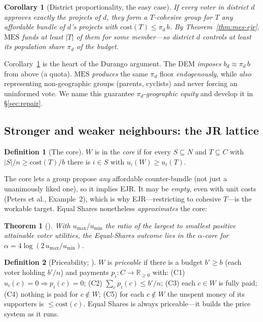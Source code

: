 \documentclass[11pt,letterpaper]{article}
\theoremstyle{definition}
\newtheorem{definition}{Definition}[section]
\theoremstyle{plain}
\newtheorem{theorem}{Theorem}[section]
\newtheorem{corollary}{Corollary}[section]
\theoremstyle{remark}
\newcommand{\R}{\mathbb{R}}
\newcommand{\voters}{N}            %
\newcommand{\projects}{C}          %
\newcommand{\budget}{b}            %
\newcommand{\cost}{\mathrm{cost}}  %
\newcommand{\popshare}{\pi}        %
\newcommand{\MES}{\mathrm{MES}}
\begin{document}
\begin{corollary}[District proportionality, the easy case]
\label{cor:district}
If every voter in district $d$ approves exactly the projects of $d$, they form a $T$-cohesive group
for $T$ any affordable bundle of $d$'s projects with $\cost(T)\le \popshare_d\,\budget$. By
Theorem~\ref{thm:mes-ejr}, $\MES$ funds at least $|T|$ of them for some member---so district $d$
controls at least its population share $\popshare_d$ of the budget.
\end{corollary}

\begin{connection}
Corollary~\ref{cor:district} is the heart of the Durango argument. The DEM \emph{imposes}
$\budget_d\approx\popshare_d\,\budget$ from above (a quota). $\MES$ \emph{produces} the same
$\popshare_d$ floor \emph{endogenously}, while \emph{also} representing non-geographic groups
(parents, cyclists) and never forcing an uninformed vote. We name this guarantee
$\popshare_d$-\emph{geographic equity} and develop it in \S\ref{sec:repair}.
\end{connection}

\subsection{Stronger and weaker neighbours: the JR lattice}

\begin{definition}[The core]
$W$ is in the \emph{core} if for every $S\subseteq \voters$ and $T\subseteq \projects$ with
$|S|/n\ge\cost(T)/\budget$ there is $i\in S$ with $u_i(W)\ge u_i(T)$.
\end{definition}

The core lets a group propose \emph{any} affordable counter-bundle (not just a unanimously liked
one), so it implies EJR. It may be \emph{empty}, even with unit costs (Peters et al., Example~2),
which is why EJR---restricting to cohesive $T$---is the workable target. Equal Shares nonetheless
\emph{approximates} the core:

\begin{theorem}[\citealp{peters2021}]
With $u_{\max}/u_{\min}$ the ratio of the largest to smallest positive attainable voter utilities,
the Equal-Shares outcome lies in the $\alpha$-core for $\alpha=4\log(2\,u_{\max}/u_{\min})$.
\end{theorem}

\begin{definition}[Priceability; \citealp{petersskowron2020}]
\label{def:price}
$W$ is \emph{priceable} if there is a budget $b'\ge\budget$ (each voter holding $b'/n$) and
payments $p_i\colon \projects\to\R_{\ge0}$ with: (C1) $u_i(c)=0\Rightarrow p_i(c)=0$;
(C2) $\sum_c p_i(c)\le b'/n$; (C3) each $c\in W$ is fully paid; (C4) nothing is paid for $c\notin
W$; (C5) for each $c\notin W$ the unspent money of its supporters is $\le\cost(c)$. Equal Shares is
always priceable---it builds the price system as it runs.
\end{definition}
\end{document}
